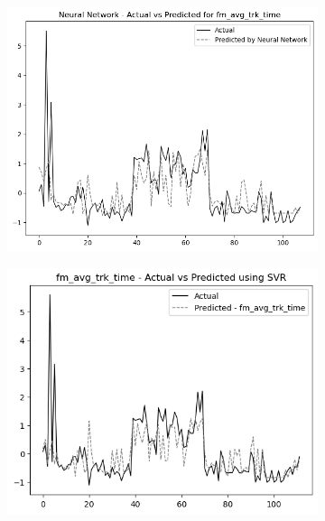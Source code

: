 \begin{figure}
    \centering
    \begin{subfigure}[b]{0.49\textwidth}
        \centering
        \includegraphics[width=\linewidth]{images/all_data_fine_motor_avg_tracking_time.png}
    \end{subfigure}\hfill
    \begin{subfigure}[b]{0.49\textwidth}
        \centering
        \includegraphics[width=\linewidth]{images/all_data_fine_motor_tracking_time.png}
    \end{subfigure}
    

\end{figure}
